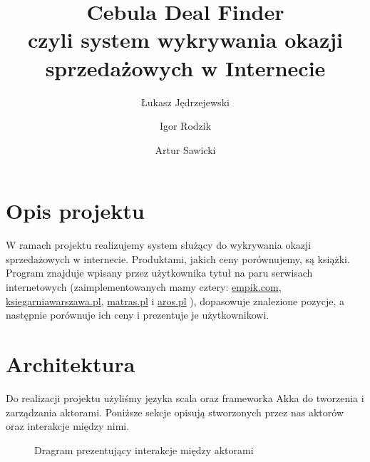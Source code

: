 \documentclass[a4paper,12pt]{mwart}
\begin{document}
\title{Cebula Deal Finder\\%
{\large czyli system wykrywania okazji sprzedażowych w Internecie} }

\author{Łukasz Jędrzejewski \and Igor Rodzik \and Artur Sawicki}

\maketitle

\section{Opis projektu}
W ramach projektu realizujemy system służący do wykrywania okazji sprzedażowych w internecie. Produktami, jakich ceny porównujemy, są książki.
Program znajduje wpisany przez użytkownika tytuł na paru serwisach internetowych (zaimplementowanych mamy cztery:
\href{http://www.empik.com}{empik.com}, \href{http://www.ksiegarniawarszawa.pl}{ksiegarniawarszawa.pl}, \href{http://www.matras.pl}{matras.pl} i \href{http://www.aros.pl}{aros.pl}
), dopasowuje znalezione pozycje, a następnie porównuje ich ceny i prezentuje je użytkownikowi.

\section{Architektura}
Do realizacji projektu użyliśmy języka scala oraz frameworka Akka do tworzenia i zarządzania aktorami.
Poniższe sekcje opisują stworzonych przez nas aktorów oraz interakcje między nimi.

\begin{figure}[H]
  \centering
  \caption{Dragram prezentujący interakcje między aktorami}
\end{figure}
\end{document}
